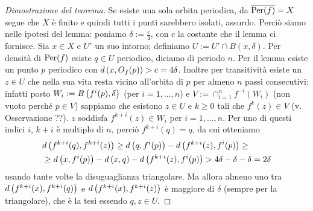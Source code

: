 \begin{proof}[Dimostrazione del teorema]Se esiste una sola orbita periodica,
da $\overline{\operatorname{Per}(f)}=X$ segue che $X$ è finito e quindi tutti i punti sarebbero isolati, assurdo.\newline
Perciò siamo nelle ipotesi del lemma: poniamo $\delta:=\frac{c}{4}$, con $c$ la costante che il lemma ci fornisce.
Sia $x\in X$ e $U'$ un suo intorno; definiamo $U:=U'\cap B(x,\delta)$. Per densità di $\operatorname{Per}(f)$ esiste $q\in U$ periodico,
diciamo di periodo $n$. Per il lemma esiste un punto $p$ periodico con $d\left(x,O_f(p)\right)>c=4\delta$. Inoltre per transitività
esiste un $z\in U$ che nella sua vita resta vicino all'orbita di $p$ per almeno $n$ passi consecutivi:
infatti posto $W_i:=B\left(f^i(p),\delta\right)$ (per $i=1,\dots,n$) e $V:=\cap_{i=1}^n f^{-i}(W_i)$ (non vuoto perché $p\in V$)
sappiamo che esistono $z\in U$ e $k\ge 0$ tali che $f^k(z)\in V$ (v. Osservazione ??). $z$ soddisfa
$f^{k+i}(z)\in W_i$ per $i=1,\dots,n$. Per uno di questi indici $i$, $k+i$ è multiplo di $n$,
perciò $f^{k+i}(q)=q$, da cui otteniamo
\[ \begin{split} &d\left(f^{k+i}(q),f^{k+i}(z)\right)\ge d\left(q,f^i(p)\right)-d\left(f^{k+i}(z),f^i(p)\right)\ge \\
&\ge d\left(x,f^i(p)\right)-d\left(x,q\right)-d\left(f^{k+i}(z),f^i(p)\right)>4\delta-\delta-\delta=2\delta \end{split} \]
usando tante volte la disuguaglianza triangolare. Ma allora almeno uno tra
$d\left(f^{k+i}(x),f^{k+i}(q)\right)$ e $d\left(f^{k+i}(x),f^{k+i}(z)\right)$ è maggiore di $\delta$ (sempre per la triangolare), che è la tesi
essendo $q,z\in U$.
\end{proof}



